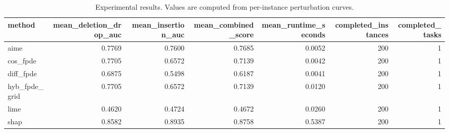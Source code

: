 \begin{table}[t]
\caption{Experimental results. Values are computed from per-instance perturbation curves.}
\label{tab:main_results_computed}
\centering
\begin{tabular}{lrrrrrr}
\toprule
method & mean\_deletion\_drop\_auc & mean\_insertion\_auc & mean\_combined\_score & mean\_runtime\_seconds & completed\_instances & completed\_tasks \\
\midrule
aime & 0.7769 & 0.7600 & 0.7685 & 0.0052 & 200 & 1 \\
cos\_fpde & 0.7705 & 0.6572 & 0.7139 & 0.0042 & 200 & 1 \\
diff\_fpde & 0.6875 & 0.5498 & 0.6187 & 0.0041 & 200 & 1 \\
hyb\_fpde\_grid & 0.7705 & 0.6572 & 0.7139 & 0.0120 & 200 & 1 \\
lime & 0.4620 & 0.4724 & 0.4672 & 0.0260 & 200 & 1 \\
shap & 0.8582 & 0.8935 & 0.8758 & 0.5387 & 200 & 1 \\
\bottomrule
\end{tabular}

\end{table}
